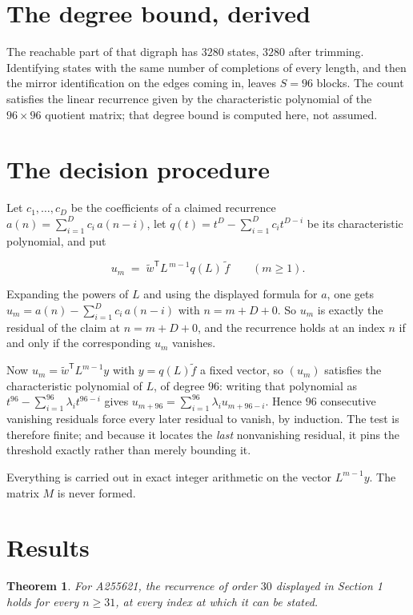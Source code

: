 \documentclass[11pt]{article}
\newtheorem{theorem}{Theorem}
\theoremstyle{definition}
\begin{document}
\section{The degree bound, derived}

The reachable part of that digraph has $3280$ states, $3280$ after trimming. Identifying states with the same number of completions of every length, and then the mirror identification on the edges coming in, leaves $S = 96$ blocks. The count satisfies the linear recurrence given by the characteristic polynomial of the $96\times96$ quotient matrix; that degree bound is computed here, not assumed.

\section{The decision procedure}

Let $c_1,\dots,c_D$ be the coefficients of a claimed recurrence $a(n) = \sum_{i=1}^{D} c_i\,a(n-i)$, let $q(t) = t^{D} - \sum_{i=1}^{D} c_i t^{D-i}$ be its characteristic polynomial, and put

\[u_m \;=\; \tilde w^{\mathsf T} L^{\,m-1} q(L)\,\tilde f \qquad (m \ge 1).\]

Expanding the powers of $L$ and using the displayed formula for $a$, one gets $u_m = a(n) - \sum_{i=1}^{D} c_i\,a(n-i)$ with $n = m + D + 0$. So $u_m$ is exactly the residual of the claim at $n = m + D + 0$, and the recurrence holds at an index $n$ if and only if the corresponding $u_m$ vanishes.

Now $u_m = \tilde w^{\mathsf T} L^{m-1} y$ with $y = q(L)\tilde f$ a fixed vector, so $(u_m)$ satisfies the characteristic polynomial of $L$, of degree $96$: writing that polynomial as $t^{96} - \sum_{i=1}^{96} \lambda_i t^{96-i}$ gives $u_{m+96} = \sum_{i=1}^{96} \lambda_i u_{m+96-i}$. Hence $96$ consecutive vanishing residuals force every later residual to vanish, by induction. The test is therefore finite; and because it locates the {\itshape last} nonvanishing residual, it pins the threshold exactly rather than merely bounding it.

Everything is carried out in exact integer arithmetic on the vector $L^{m-1}y$. The matrix $M$ is never formed.

\section{Results}

\begin{theorem} For A255621, the recurrence of order $30$ displayed in Section 1 holds for every $n \ge 31$, at every index at which it can be stated.\end{theorem}
\end{document}
